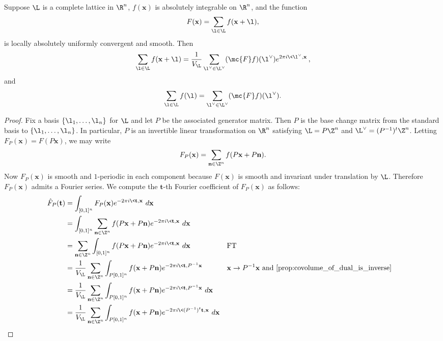     \begin{theorem}
      Suppose $\L$ is a complete lattice in $\R^{n}$, $f(\mathbf{x})$ is absolutely integrable on $\R^{n}$, and the function
      \[
        F(\mathbf{x}) = \sum_{\l \in \L}f(\mathbf{x}+\l),
      \]
      is locally absolutely uniformly convergent and smooth. Then
      \[
        \sum_{\l \in \L}f(\mathbf{x}+\l) = \frac{1}{V_{\L}}\sum_{\l^{\vee} \in \L^{\vee}}(\mc{F}f)(\l^{\vee})e^{2\pi i\<\l^{\vee},\mathbf{x}\>},
      \]
      and
      \[
        \sum_{\l \in \L}f(\l) = \sum_{\l^{\vee} \in \L^{\vee}}(\mc{F}f)(\l^{\vee}).
      \]
    \end{theorem}
    \begin{proof}
      Fix a basis $\{\l_{1},\ldots,\l_{n}\}$ for $\L$ and let $P$ be the associated generator matrix. Then $P$ is the base change matrix from the standard basis to $\{\l_{1},\ldots,\l_{n}\}$. In particular, $P$ is an invertible linear transformation on $\R^{n}$ satisfying $\L = P\Z^{n}$ and $\L^{\vee} = (P^{-1})^{t}\Z^{n}$. Letting $ F_{P}(\mathbf{x}) = F(P\mathbf{x})$, we may write
      \[
        F_{P}(\mathbf{x}) = \sum_{\mathbf{n} \in \Z^{n}}f(P\mathbf{x}+P\mathbf{n}).
      \]
      Now $F_{P}(\mathbf{x})$ is smooth and $1$-periodic in each component because $F(\mathbf{x})$ is smooth and invariant under translation by $\L$. Therefore $F_{P}(\mathbf{x})$ admits a Fourier series. We compute the $\mathbf{t}$-th Fourier coefficient of $F_{P}(\mathbf{x})$ as follows:
      \begin{align*}
        \hat{F}_{P}(\mathbf{t}) &= \int_{[0,1]^{n}}F_{P}(\mathbf{x})e^{-2\pi i\<\mathbf{t},\mathbf{x}\>}\,d\mathbf{x} \\
        &= \int_{[0,1]^{n}}\sum_{\mathbf{n} \in \Z^{n}}f(P\mathbf{x}+P\mathbf{n})e^{-2\pi i\<\mathbf{t},\mathbf{x}\>}\,d\mathbf{x} \\
        &= \sum_{\mathbf{n} \in \Z^{n}}\int_{[0,1]^{n}}f(P\mathbf{x}+P\mathbf{n})e^{-2\pi i\<\mathbf{t},\mathbf{x}\>}\,d\mathbf{x} && \text{FT} \\
        &= \frac{1}{V_{\L}}\sum_{\mathbf{n} \in \Z^{n}}\int_{P[0,1]^{n}}f(\mathbf{x}+P\mathbf{n})e^{-2\pi i\<\mathbf{t},P^{-1}\mathbf{x}\>} && \text{$\mathbf{x} \to P^{-1}\mathbf{x}$ and \cref{prop:covolume_of_dual_is_inverse}} \\
        &= \frac{1}{V_{\L}}\sum_{\mathbf{n} \in \Z^{n}}\int_{P[0,1]^{n}}f(\mathbf{x}+P\mathbf{n})e^{-2\pi i\<\mathbf{t},P^{-1}\mathbf{x}\>}\,d\mathbf{x} \\
        &= \frac{1}{V_{\L}}\sum_{\mathbf{n} \in \Z^{n}}\int_{P[0,1]^{n}}f(\mathbf{x}+P\mathbf{n})e^{-2\pi i\<(P^{-1})^{t}\mathbf{t},\mathbf{x}\>}\,d\mathbf{x} \\

\end{align*}
\end{proof}
